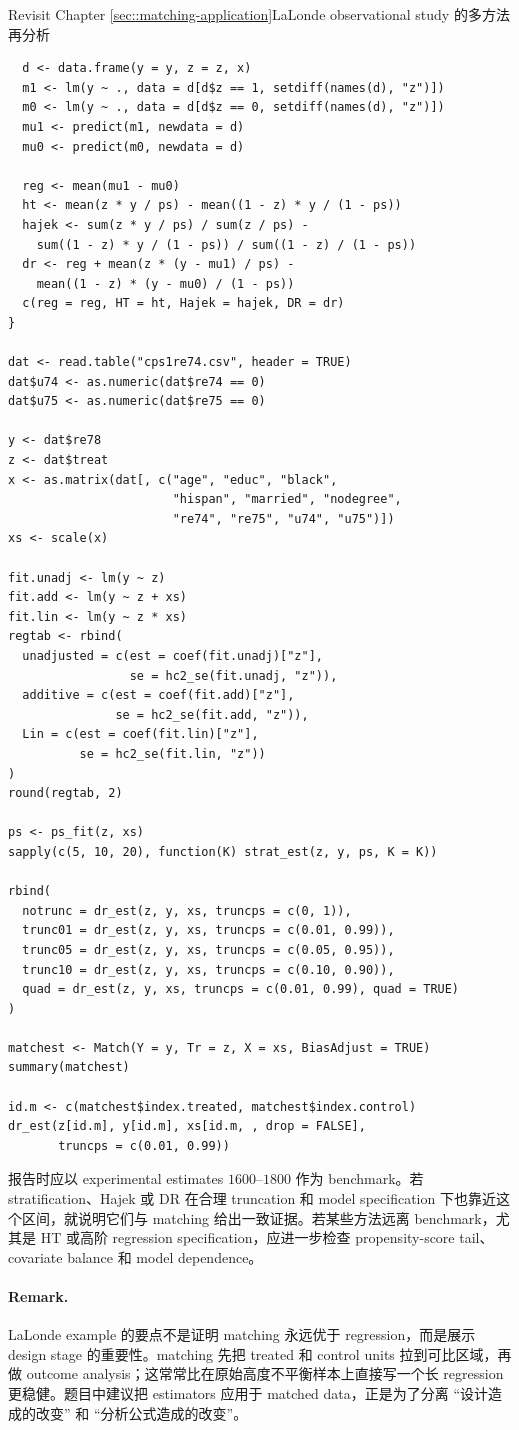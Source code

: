 \begin{exercisesolution}{Revisit Chapter \cref{sec::matching-application}}{LaLonde observational study 的多方法再分析}
\begin{lstlisting}
  d <- data.frame(y = y, z = z, x)
  m1 <- lm(y ~ ., data = d[d$z == 1, setdiff(names(d), "z")])
  m0 <- lm(y ~ ., data = d[d$z == 0, setdiff(names(d), "z")])
  mu1 <- predict(m1, newdata = d)
  mu0 <- predict(m0, newdata = d)

  reg <- mean(mu1 - mu0)
  ht <- mean(z * y / ps) - mean((1 - z) * y / (1 - ps))
  hajek <- sum(z * y / ps) / sum(z / ps) -
    sum((1 - z) * y / (1 - ps)) / sum((1 - z) / (1 - ps))
  dr <- reg + mean(z * (y - mu1) / ps) -
    mean((1 - z) * (y - mu0) / (1 - ps))
  c(reg = reg, HT = ht, Hajek = hajek, DR = dr)
}

dat <- read.table("cps1re74.csv", header = TRUE)
dat$u74 <- as.numeric(dat$re74 == 0)
dat$u75 <- as.numeric(dat$re75 == 0)

y <- dat$re78
z <- dat$treat
x <- as.matrix(dat[, c("age", "educ", "black",
                       "hispan", "married", "nodegree",
                       "re74", "re75", "u74", "u75")])
xs <- scale(x)

fit.unadj <- lm(y ~ z)
fit.add <- lm(y ~ z + xs)
fit.lin <- lm(y ~ z * xs)
regtab <- rbind(
  unadjusted = c(est = coef(fit.unadj)["z"],
                 se = hc2_se(fit.unadj, "z")),
  additive = c(est = coef(fit.add)["z"],
               se = hc2_se(fit.add, "z")),
  Lin = c(est = coef(fit.lin)["z"],
          se = hc2_se(fit.lin, "z"))
)
round(regtab, 2)

ps <- ps_fit(z, xs)
sapply(c(5, 10, 20), function(K) strat_est(z, y, ps, K = K))

rbind(
  notrunc = dr_est(z, y, xs, truncps = c(0, 1)),
  trunc01 = dr_est(z, y, xs, truncps = c(0.01, 0.99)),
  trunc05 = dr_est(z, y, xs, truncps = c(0.05, 0.95)),
  trunc10 = dr_est(z, y, xs, truncps = c(0.10, 0.90)),
  quad = dr_est(z, y, xs, truncps = c(0.01, 0.99), quad = TRUE)
)

matchest <- Match(Y = y, Tr = z, X = xs, BiasAdjust = TRUE)
summary(matchest)

id.m <- c(matchest$index.treated, matchest$index.control)
dr_est(z[id.m], y[id.m], xs[id.m, , drop = FALSE],
       truncps = c(0.01, 0.99))
\end{lstlisting}

报告时应以 experimental estimates $1600$--$1800$ 作为 benchmark。若 stratification、Hajek 或 DR 在合理 truncation 和 model specification 下也靠近这个区间，就说明它们与 matching 给出一致证据。若某些方法远离 benchmark，尤其是 HT 或高阶 regression specification，应进一步检查 propensity-score tail、covariate balance 和 model dependence。

\paragraph{Remark.}
LaLonde example 的要点不是证明 matching 永远优于 regression，而是展示 design stage 的重要性。matching 先把 treated 和 control units 拉到可比区域，再做 outcome analysis；这常常比在原始高度不平衡样本上直接写一个长 regression 更稳健。题目中建议把 estimators 应用于 matched data，正是为了分离 ``设计造成的改变'' 和 ``分析公式造成的改变''。
\end{exercisesolution}

